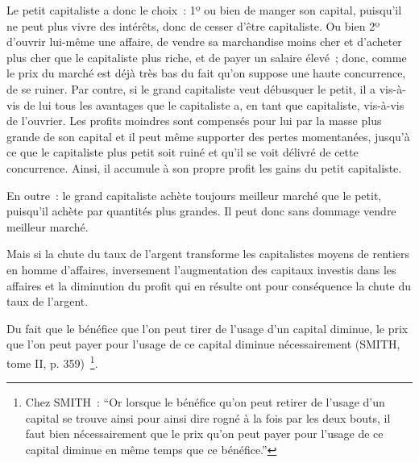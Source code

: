 \documentclass[french,twoside]{book} %
\newenvironment{quoteblock}%
  {\begin{quoting}}
  {\end{quoting}}
\newenvironment{quotebar}{%
    \def\FrameCommand{{\color{rubric!10!}\vrule width 0.5em} \hspace{0.9em}}%
    \def\OuterFrameSep{\itemsep} %
    \MakeFramed {\advance\hsize-\width \FrameRestore}
  }%
  {%
    \endMakeFramed
  }
\renewenvironment{quoteblock}%
  {%
    \savenotes
    \setstretch{0.9}
    \normalfont
    \begin{quotebar}
  }
  {%
    \end{quotebar}
    \spewnotes
  }
\begin{document}
\noindent Le petit capitaliste a donc le choix : 1º ou bien de manger son capital, puisqu’il ne peut plus vivre des intérêts, donc de cesser d’être capitaliste. Ou bien 2º d’ouvrir lui-même une affaire, de vendre sa marchandise moins cher et d’acheter plus cher que le capitaliste plus riche, et de payer un salaire élevé ; donc, comme le prix du marché est déjà très bas du fait qu’on suppose une haute concurrence, de se ruiner. Par contre, si le grand capitaliste veut débusquer le petit, il a vis-à-vis de lui tous les avantages que le capitaliste a, en tant que capitaliste, vis-à-vis de l’ouvrier. Les profits moindres sont compensés pour lui par la masse plus grande de son capital et il peut même supporter des pertes momentanées, jusqu’à ce que le capitaliste plus petit soit ruiné et qu’il se voit délivré de cette concurrence. Ainsi, il accumule à son propre profit les gains du petit capitaliste.\par
En outre : le grand capitaliste achète toujours meilleur marché que le petit, puisqu’il achète par quantités plus grandes. Il peut donc sans dommage vendre meilleur marché.\par
Mais si la chute du taux de l’argent transforme les capitalistes moyens de rentiers en homme d’affaires, inversement l’augmentation des capitaux investis dans les affaires et la diminution du profit qui en résulte ont pour conséquence la chute du taux de l’argent.\par

\begin{quoteblock}
 \noindent Du fait que le bénéfice que l’on peut tirer de l’usage d’un capital diminue, le prix que l’on peut payer pour l’usage de ce capital diminue nécessairement (SMITH, tome II, p. 359) \footnote{Chez SMITH : “Or lorsque le bénéfice qu’on peut retirer de l’usage d’un capital se trouve ainsi pour ainsi dire rogné à la fois par les deux bouts, il faut bien nécessairement que le prix qu’on peut payer pour l’usage de ce capital diminue en même temps que ce bénéfice.”}.
 \end{quoteblock}
\end{document}
